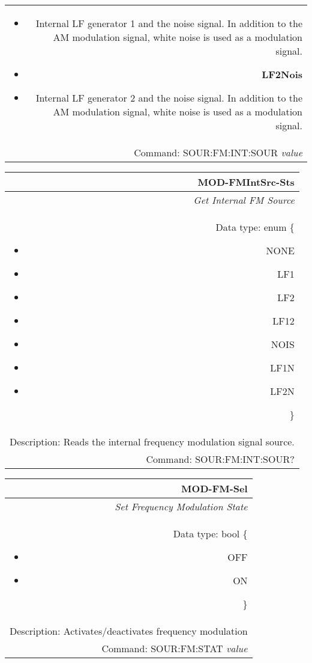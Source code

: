 \documentclass[openany]{article}
\begin{document}
\begin{tabular}{N}
\begin{itemize}[noitemsep]
                                \item[] Internal LF generator 1 and the noise signal. In addition to the AM modulation signal, white noise is used as a modulation signal.
                                \item[] \textbf{LF2Nois}
                                \item[] Internal LF generator 2 and the noise signal. In addition to the AM modulation signal, white noise is used as a modulation signal.
			\end{itemize} \\
			Command: SOUR:FM:INT:SOUR \emph{value} \\

		\end{tabular}


		\begin{tabular}{N}
			\hline
			\bfseries MOD-FMIntSrc-Sts \\ \hline
			\emph{Get Internal FM Source} \\
			Data type: enum \{\begin{itemize}[noitemsep]
				\small
				\item[] NONE
				\item[] LF1
				\item[] LF2
				\item[] LF12
				\item[] NOIS
				\item[] LF1N
				\item[] LF2N
			\end{itemize}\} \\ 
			Description: Reads the internal frequency modulation signal source. \\
			Command: SOUR:FM:INT:SOUR? \\

		\end{tabular}
%
		\begin{tabular}{N}
			\hline
			\bfseries MOD-FM-Sel \\ \hline
			\emph{Set Frequency Modulation State} \\
			Data type: bool \{\begin{itemize}[noitemsep]
				\small
				\item[] OFF
				\item[] ON
			\end{itemize}\} \\
			Description: Activates/deactivates frequency modulation\\
			Command: SOUR:FM:STAT \emph{value} \\

		\end{tabular}
\end{document}
